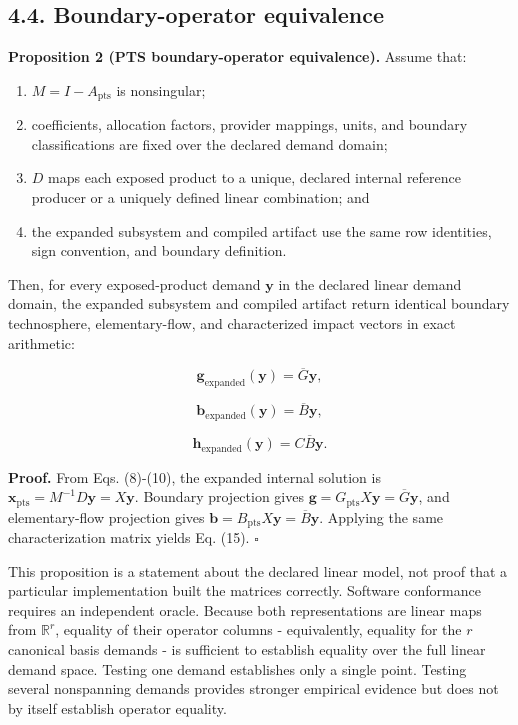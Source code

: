 \documentclass[
  10pt,
  a4paper,
  DIV=11,
  numbers=noendperiod]{scrartcl}
\providecommand{\tightlist}{%
  \setlength{\itemsep}{0pt}\setlength{\parskip}{0pt}}
\begin{document}
\subsection{4.4. Boundary-operator
equivalence}\label{boundary-operator-equivalence}

\textbf{Proposition 2 (PTS boundary-operator equivalence).} Assume that:

\begin{enumerate}
\def\labelenumi{\arabic{enumi}.}
\tightlist
\item
  \(M=I-A_{\mathrm{pts}}\) is nonsingular;
\item
  coefficients, allocation factors, provider mappings, units, and
  boundary classifications are fixed over the declared demand domain;
\item
  \(D\) maps each exposed product to a unique, declared internal
  reference producer or a uniquely defined linear combination; and
\item
  the expanded subsystem and compiled artifact use the same row
  identities, sign convention, and boundary definition.
\end{enumerate}

Then, for every exposed-product demand \(\mathbf y\) in the declared
linear demand domain, the expanded subsystem and compiled artifact
return identical boundary technosphere, elementary-flow, and
characterized impact vectors in exact arithmetic:

\[
\mathbf g_{\mathrm{expanded}}(\mathbf y)
=
\overline G\mathbf y,
\tag{13}
\]

\[
\mathbf b_{\mathrm{expanded}}(\mathbf y)
=
\overline B\mathbf y,
\tag{14}
\]

\[
\mathbf h_{\mathrm{expanded}}(\mathbf y)
=
C\overline B\mathbf y.
\tag{15}
\]

\textbf{Proof.} From Eqs. (8)-(10), the expanded internal solution is
\(\mathbf{x}_{\mathrm{pts}}=M^{-1}D\mathbf y=X\mathbf y\). Boundary
projection gives
\(\mathbf g=G_{\mathrm{pts}}X\mathbf y=\overline G\mathbf y\), and
elementary-flow projection gives
\(\mathbf b=B_{\mathrm{pts}}X\mathbf y=\overline B\mathbf y\). Applying
the same characterization matrix yields Eq. (15). \(\square\)

This proposition is a statement about the declared linear model, not
proof that a particular implementation built the matrices correctly.
Software conformance requires an independent oracle. Because both
representations are linear maps from \(\mathbb{R}^r\), equality of their
operator columns - equivalently, equality for the \(r\) canonical basis
demands - is sufficient to establish equality over the full linear
demand space. Testing one demand establishes only a single point.
Testing several nonspanning demands provides stronger empirical evidence
but does not by itself establish operator equality.
\end{document}
